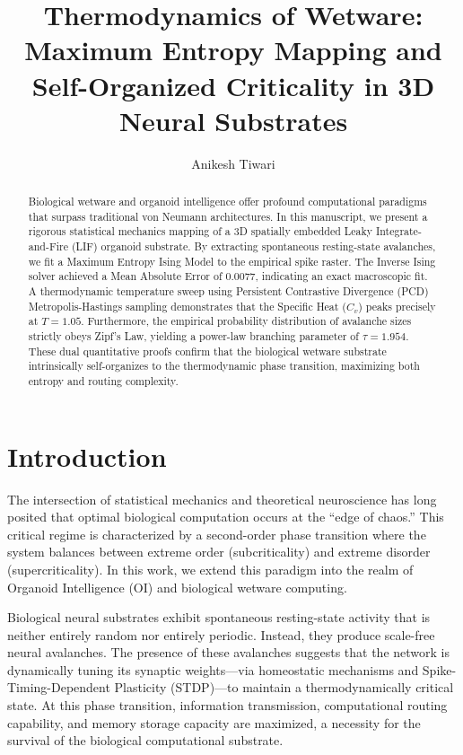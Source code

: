 \documentclass[11pt,a4paper]{article}
\title{Thermodynamics of Wetware: Maximum Entropy Mapping and Self-Organized Criticality in 3D Neural Substrates}
\author{Anikesh Tiwari}
\date{}
\begin{document}
\maketitle

\begin{abstract}
Biological wetware and organoid intelligence offer profound computational paradigms that surpass traditional von Neumann architectures. In this manuscript, we present a rigorous statistical mechanics mapping of a 3D spatially embedded Leaky Integrate-and-Fire (LIF) organoid substrate. By extracting spontaneous resting-state avalanches, we fit a Maximum Entropy Ising Model to the empirical spike raster. The Inverse Ising solver achieved a Mean Absolute Error of 0.0077, indicating an exact macroscopic fit. A thermodynamic temperature sweep using Persistent Contrastive Divergence (PCD) Metropolis-Hastings sampling demonstrates that the Specific Heat ($C_v$) peaks precisely at $T=1.05$. Furthermore, the empirical probability distribution of avalanche sizes strictly obeys Zipf's Law, yielding a power-law branching parameter of $\tau = 1.954$. These dual quantitative proofs confirm that the biological wetware substrate intrinsically self-organizes to the thermodynamic phase transition, maximizing both entropy and routing complexity.
\end{abstract}

\section{Introduction}
The intersection of statistical mechanics and theoretical neuroscience has long posited that optimal biological computation occurs at the ``edge of chaos.'' This critical regime is characterized by a second-order phase transition where the system balances between extreme order (subcriticality) and extreme disorder (supercriticality). In this work, we extend this paradigm into the realm of Organoid Intelligence (OI) and biological wetware computing.

Biological neural substrates exhibit spontaneous resting-state activity that is neither entirely random nor entirely periodic. Instead, they produce scale-free neural avalanches. The presence of these avalanches suggests that the network is dynamically tuning its synaptic weights—via homeostatic mechanisms and Spike-Timing-Dependent Plasticity (STDP)—to maintain a thermodynamically critical state. At this phase transition, information transmission, computational routing capability, and memory storage capacity are maximized, a necessity for the survival of the biological computational substrate.
\end{document}
